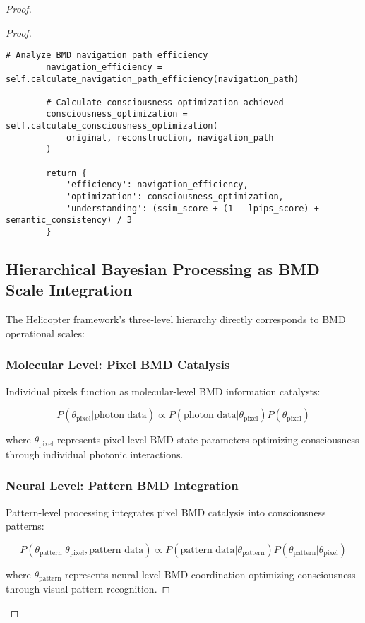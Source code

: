 \documentclass[12pt,a4paper]{article}
\begin{document}
\begin{proof}
{\begin{proof}
\begin{lstlisting}[style=pythonstyle, caption=BMD Navigation Validation Through Visual Reconstruction]
        # Analyze BMD navigation path efficiency
        navigation_efficiency = self.calculate_navigation_path_efficiency(navigation_path)
        
        # Calculate consciousness optimization achieved
        consciousness_optimization = self.calculate_consciousness_optimization(
            original, reconstruction, navigation_path
        )
        
        return {
            'efficiency': navigation_efficiency,
            'optimization': consciousness_optimization,
            'understanding': (ssim_score + (1 - lpips_score) + semantic_consistency) / 3
        }
\end{lstlisting}

\subsection{Hierarchical Bayesian Processing as BMD Scale Integration}

The Helicopter framework's three-level hierarchy directly corresponds to BMD operational scales:

\subsubsection{Molecular Level: Pixel BMD Catalysis}

Individual pixels function as molecular-level BMD information catalysts:

$$P(\theta_{\text{pixel}} | \text{photon data}) \propto P(\text{photon data} | \theta_{\text{pixel}}) P(\theta_{\text{pixel}})$$

where $\theta_{\text{pixel}}$ represents pixel-level BMD state parameters optimizing consciousness through individual photonic interactions.

\subsubsection{Neural Level: Pattern BMD Integration}

Pattern-level processing integrates pixel BMD catalysis into consciousness patterns:

$$P(\theta_{\text{pattern}} | \theta_{\text{pixel}}, \text{pattern data}) \propto P(\text{pattern data} | \theta_{\text{pattern}}) P(\theta_{\text{pattern}} | \theta_{\text{pixel}})$$

where $\theta_{\text{pattern}}$ represents neural-level BMD coordination optimizing consciousness through visual pattern recognition.


\end{proof}}
\end{proof}
\end{document}
